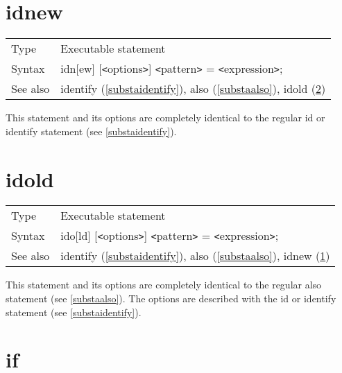 
\section{idnew}
\label{substaidnew}

\noindent \begin{tabular}{ll}
Type & Executable statement\\
Syntax & idn[ew] [{\tt<}options{\tt>}] {\tt<}pattern{\tt>} = {\tt<}expression{\tt>};
\\ See also & identify (\ref{substaidentify}),
              also (\ref{substaalso}),
              idold (\ref{substaidold})
\end{tabular} \vspace{4mm}

\noindent This statement and its options are completely 
identical to the regular id or identify statement 
(see \ref{substaidentify}). \vspace{10mm}


\section{idold}
\label{substaidold}

\noindent \begin{tabular}{ll}
Type & Executable statement\\
Syntax & ido[ld] [{\tt<}options{\tt>}] {\tt<}pattern{\tt>} = {\tt<}expression{\tt>};
\\ See also & identify (\ref{substaidentify}),
              also (\ref{substaalso}),
              idnew (\ref{substaidnew})
\end{tabular}\vspace{4mm}

\noindent This statement and its options are completely 
identical to the regular also statement (see \ref{substaalso}). 
The options are described with the id or identify 
statement (see \ref{substaidentify}).
\vspace{10mm}

 
\section{if}
\label{substaif}

